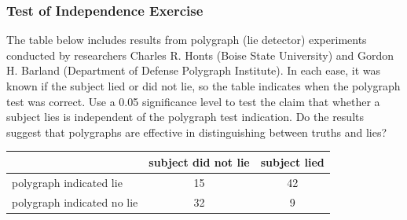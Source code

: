 \documentclass[xcolor=dvipsnames]{beamer}
\begin{document}
\begin{frame}
  \frametitle{Test of Independence Exercise}
  {\ubung} The table below includes results from polygraph (lie
  detector) experiments conducted by researchers Charles R. Honts
  (Boise State University) and Gordon H. Barland (Department of Defense
  Polygraph Institute). In each ease, it was known if the subject lied
  or did not lie, so the table indicates when the polygraph test was
  correct. Use a 0.05 significance level to test the claim that
  whether a subject lies is independent of the polygraph test
  indication. Do the results suggest that polygraphs are effective in
  distinguishing between truths and lies?

  \bigskip
  
  \begin{tabular}{|l|c|c|}\hline
    & subject did not lie & subject lied \\ \hline
    polygraph indicated lie & 15 & 42 \\ \hline
    polygraph indicated no lie & 32 & 9 \\ \hline
  \end{tabular}
\end{frame}

\end{document}
